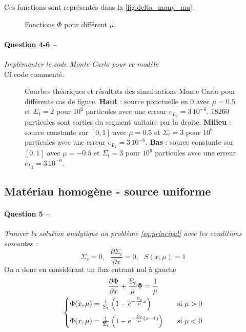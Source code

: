 \documentclass[11pt,a4paper]{article}
\newcommand{\dx}[1]{\dfrac{\partial #1}{\partial x}}
\newcommand{\question}[2]{\paragraph{Question #1 --}\hspace{-7pt}\textit{#2} \\}
\begin{document}
Ces fonctions sont représentés dans la \autoref{fig:delta_many_mu}.

\begin{figure}
  \centering
  \caption{Fonctions $\Phi$ pour différent $\mu$.}
  \label{fig:delta_many_mu}
\end{figure}

\question{4-6}{Implémenter le code Monte-Carlo pour ce modèle}

Cf code commenté.

\begin{figure}
  \centering
  \caption{Courbes théoriques et résultats des simuluations Monte Carlo pour différents cas de figure.
    \textbf{Haut} : source ponctuelle en 0 avec $\mu=0.5$ et $\Sigma_t=2$ pour $10^6$ particules avec une erreur $e_{L_2} = 3\,10^{-6}$. 18260 particules sont sorties du segment unitaire par la droite. 
    \textbf{Milieu} : source constante sur $[0,1]$ avec $\mu=0.5$ et $\Sigma_t=3$ pour $10^6$ particules avec une erreur $e_{L_2} = 3\,10^{-6}$.
    \textbf{Bas} :  source constante sur $[0,1]$ avec $\mu=-0.5$ et $\Sigma_t=3$ pour $10^6$ particules avec une erreur $e_{L_2} = 3\,10^{-6}$.}
  \label{fig:sigmacst}
\end{figure}

\subsection{Matériau homogène - source uniforme}

\question{5}{Trouver la solution analytique au problème \autoref{eq:principal} avec les conditions suivantes :}

\begin{equation}
  \Sigma_s=0, ~~~ \dx{\Sigma_t} = 0, ~~~ S(x, \mu) = 1
\end{equation}
On a donc en considérant un flux entrant nul à gauche 
\begin{gather}
  \dx{\Phi} + \frac{\Sigma_t}{\mu} \Phi = \frac{1}{\mu} \\
  \begin{cases}
    \Phi(x, \mu)= \frac{1}{\Sigma_t}\left( 1-e^{-\frac{\Sigma_t}{\mu}x}\right) &~~~ \mbox{si } \mu>0 \medskip \\ %
    \Phi(x, \mu)= \frac{1}{\Sigma_t}\left( 1-e^{-\frac{\Sigma_t}{\mu}(x-1)}\right) &~~~ \mbox{si } \mu<0 
  \end{cases}
\end{gather}
\end{document}
